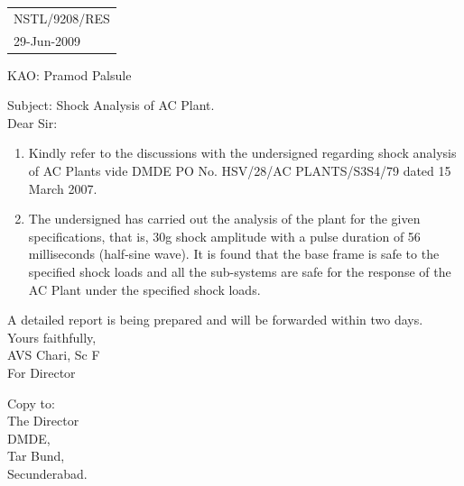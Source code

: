 \documentclass[11pt,A4]{article}
\begin{document}
\vspace*{-3.1cm}
\begin{flushright}
\begin{tabular}{l}
NSTL/9208/RES \\
29-Jun-2009\\
\end{tabular}
\end{flushright}
\vspace*{2.1cm}
\large
\noindent  KAO: Pramod Palsule\\
\vspace*{-0.25cm}

\noindent Subject: Shock Analysis of AC Plant.\\

\noindent Dear Sir: \\
\begin{enumerate}
\item Kindly refer to the discussions with the undersigned regarding shock analysis of AC Plants vide DMDE PO No. HSV/28/AC PLANTS/S3S4/79 dated 15 March 2007.

\item The undersigned has carried out the analysis of the plant for the given specifications, that is, 30g shock amplitude with a pulse duration of 56 milliseconds (half-sine wave).
 It is found that the base frame is safe to the specified shock loads and all the sub-systems are safe for the response of the AC Plant under the specified shock loads.
 \end{enumerate}
 
  \indent A detailed report is being prepared and will be forwarded within two days.\\

\vspace*{1cm}
\noindent Yours faithfully,\\

\vspace*{0.5cm}
\noindent AVS Chari, Sc F\\
\noindent For Director

\vspace*{1cm}
\noindent Copy to:\\
 The Director \\
 DMDE,\\
Tar Bund,\\
Secunderabad.\\
\end{document}
